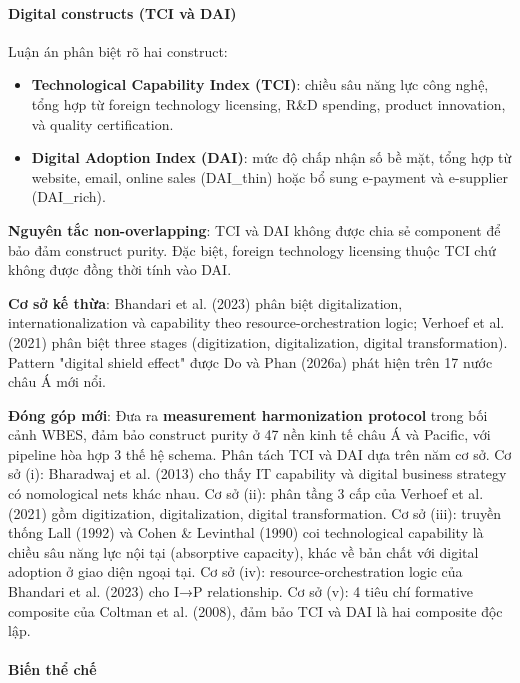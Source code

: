 \documentclass[12pt,a4paper]{article}
\providecommand{\tightlist}{\setlength{\itemsep}{0pt}\setlength{\parskip}{0pt}}
\begin{document}
\hypertarget{digital-constructs-tci-vuxe0-dai}{%
\paragraph{Digital constructs (TCI và
DAI)}\label{digital-constructs-tci-vuxe0-dai}}

Luận án phân biệt rõ hai construct:

\begin{itemize}
\tightlist
\item
  \textbf{Technological Capability Index (TCI)}: chiều sâu năng lực công
  nghệ, tổng hợp từ foreign technology licensing, R\&D spending, product
  innovation, và quality certification.
\item
  \textbf{Digital Adoption Index (DAI)}: mức độ chấp nhận số bề mặt,
  tổng hợp từ website, email, online sales (DAI\_thin) hoặc bổ sung
  e-payment và e-supplier (DAI\_rich).
\end{itemize}

\textbf{Nguyên tắc non-overlapping}: TCI và DAI không được chia sẻ
component để bảo đảm construct purity. Đặc biệt, foreign technology
licensing thuộc TCI chứ không được đồng thời tính vào DAI.

\textbf{Cơ sở kế thừa}: Bhandari et al. (2023) phân biệt digitalization,
internationalization và capability theo resource-orchestration logic;
Verhoef et al. (2021) phân biệt three stages (digitization,
digitalization, digital transformation). Pattern "digital shield effect"
được Do và Phan (2026a) phát hiện trên 17 nước châu Á mới nổi.

\textbf{Đóng góp mới}: Đưa ra \textbf{measurement harmonization
protocol} trong bối cảnh WBES, đảm bảo construct purity ở 47 nền kinh tế
châu Á và Pacific, với pipeline hòa hợp 3 thế hệ schema. Phân tách TCI
và DAI dựa trên năm cơ sở. Cơ sở (i): Bharadwaj et al. (2013) cho thấy
IT capability và digital business strategy có nomological nets khác
nhau. Cơ sở (ii): phân tầng 3 cấp của Verhoef et al. (2021) gồm
digitization, digitalization, digital transformation. Cơ sở (iii):
truyền thống Lall (1992) và Cohen \& Levinthal (1990) coi technological
capability là chiều sâu năng lực nội tại (absorptive capacity), khác về
bản chất với digital adoption ở giao diện ngoại tại. Cơ sở (iv):
resource-orchestration logic của Bhandari et al. (2023) cho I→P
relationship. Cơ sở (v): 4 tiêu chí formative composite của Coltman et
al. (2008), đảm bảo TCI và DAI là hai composite độc lập.

\hypertarget{biux1ebfn-thux1ec3-chux1ebf}{%
\paragraph{Biến thể chế}\label{biux1ebfn-thux1ec3-chux1ebf}}
\end{document}
